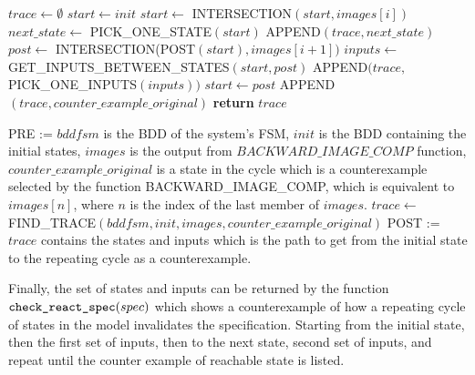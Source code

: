 \newpage

\begin{algorithmic}[1]
    \State $trace \leftarrow \emptyset$
    \State $start \leftarrow init$
     
        \State $start \leftarrow$ INTERSECTION$(start, images[i])$
        \State $next\_state \leftarrow$ PICK\_ONE\_STATE$(start)$
        \State APPEND$(trace, next\_state)$
        \State $post \leftarrow$ INTERSECTION(POST$(start), images[i+1])$
        \State $inputs \leftarrow$ GET\_INPUTS\_BETWEEN\_STATES$(start, post)$
        \State APPEND$(trace,$ PICK\_ONE\_INPUTS$(inputs))$
        \State $start \leftarrow post$
    \EndFor
    \State APPEND$(trace, counter\_example\_original)$
    \State \textbf{return }$trace$
\EndFunction
\item[]
\State PRE := $bddfsm$ is the BDD of the system's FSM, $init$ is the BDD containing the initial states, $images$ is the output from $BACKWARD\_IMAGE\_COMP$ function, $counter\_example\_original$ is a state in the cycle which is a counterexample selected by the function BACKWARD\_IMAGE\_COMP, which is equivalent to $images[n]$, where $n$ is the index of the last member of $images$.
\State $trace\leftarrow$ FIND\_TRACE$(bddfsm, init, images, counter\_example\_original)$
\State POST := $trace$ contains the states and inputs which is the path to get from the initial state to the repeating cycle as a counterexample.
\end{algorithmic}

\medskip

Finally, the set of states and inputs can be returned by the function $\verb|check_react_spec|(spec)$ which shows a counterexample of how a repeating cycle of states in the model invalidates the specification. Starting from the initial state, then the first set of inputs, then to the next state, second set of inputs, and repeat until the counter example of reachable state is listed.




